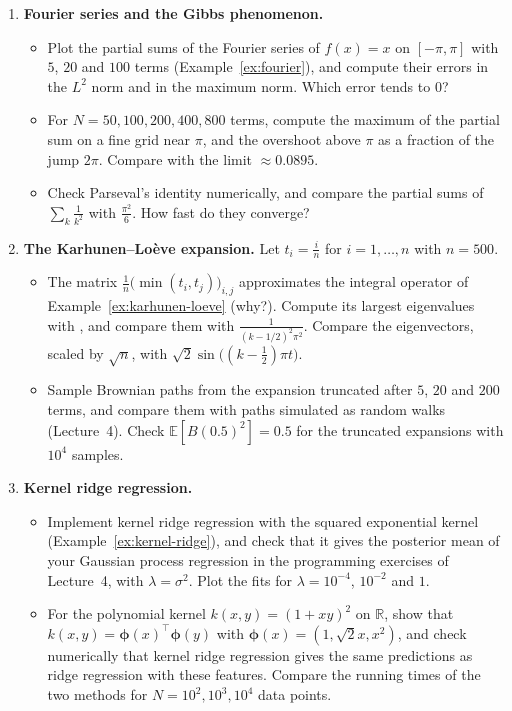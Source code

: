 \documentclass[11pt]{article}
\newcommand{\py}[1]{\texttt{\detokenize{#1}}}
\newcommand{\E}{\mathbb{E}}
\theoremstyle{definition}
\theoremstyle{plain}
\theoremstyle{remark}
\begin{document}
\begin{enumerate}[label=\textbf{P\arabic*.}, leftmargin=*]
    \item \textbf{Fourier series and the Gibbs phenomenon.}
    \begin{itemize}
        \item Plot the partial sums of the Fourier series of $f(x) = x$ on $[-\pi, \pi]$ with $5$, $20$ and $100$ terms (Example~\ref{ex:fourier}), and compute their errors in the $L^2$ norm and in the maximum norm. Which error tends to $0$?
        \item For $N = 50, 100, 200, 400, 800$ terms, compute the maximum of the partial sum on a fine grid near $\pi$, and the overshoot above $\pi$ as a fraction of the jump $2\pi$. Compare with the limit $\approx 0.0895$.
        \item Check Parseval's identity numerically, and compare the partial sums of $\sum_k \frac{1}{k^2}$ with $\frac{\pi^2}{6}$. How fast do they converge?
    \end{itemize}

    \item \textbf{The Karhunen--Lo\`eve expansion.} Let $t_i = \frac{i}{n}$ for $i = 1, \ldots, n$ with $n = 500$.
    \begin{itemize}
        \item The matrix $\frac{1}{n}\big(\min(t_i, t_j)\big)_{i, j}$ approximates the integral operator of Example~\ref{ex:karhunen-loeve} (why?). Compute its largest eigenvalues with \py{np.linalg.eigh}, and compare them with $\frac{1}{(k - 1/2)^2\pi^2}$. Compare the eigenvectors, scaled by $\sqrt{n}$, with $\sqrt{2}\sin\big((k - \frac{1}{2})\pi t\big)$.
        \item Sample Brownian paths from the expansion truncated after $5$, $20$ and $200$ terms, and compare them with paths simulated as random walks (Lecture~4). Check $\E[B(0.5)^2] = 0.5$ for the truncated expansions with $10^4$ samples.
    \end{itemize}

    \item \textbf{Kernel ridge regression.}
    \begin{itemize}
        \item Implement kernel ridge regression with the squared exponential kernel (Example~\ref{ex:kernel-ridge}), and check that it gives the posterior mean of your Gaussian process regression in the programming exercises of Lecture~4, with $\lambda = \sigma^2$. Plot the fits for $\lambda = 10^{-4}$, $10^{-2}$ and $1$.
        \item For the polynomial kernel $k(x, y) = (1 + xy)^2$ on $\mathbb{R}$, show that $k(x, y) = \boldsymbol{\phi}(x)^\top\boldsymbol{\phi}(y)$ with $\boldsymbol{\phi}(x) = (1, \sqrt{2}x, x^2)$, and check numerically that kernel ridge regression gives the same predictions as ridge regression with these features. Compare the running times of the two methods for $N = 10^2, 10^3, 10^4$ data points.
    \end{itemize}


\end{enumerate}
\end{document}
